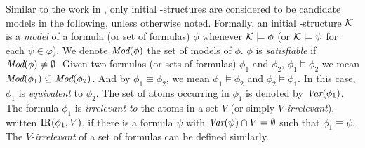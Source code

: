 \documentclass{article}
\begin{document}
Similar to the work in \cite{DBLP:journals/tcs/BrowneCG88,Bolotov:1999:JETAI},
only initial \MPK-structures are considered to be candidate models
in the following, unless otherwise noted. Formally,
an initial \MPK-structure $\cal K$ is a {\em model} of a formula (or set of formulas) $\phi$
whenever ${\cal K}\models\phi$ (or ${\cal K} \models \psi$ for each $\psi\in \varphi$).
We denote $\textit{Mod}(\phi)$ the set of models of $\phi$.
$\phi$  is {\em satisfiable}
if $\textit{Mod}(\phi)\neq\emptyset$.
Given two formulas (or sets of formulas) $\phi_1$ and $\phi_2$,  $\phi_1\models\phi_2$ we mean $\textit{Mod}(\phi_1)\subseteq\textit{Mod}(\phi_2)$. And
by $\phi_1\equiv\phi_2$, we mean $\phi_1\models\phi_2$ and $\phi_2\models\phi_1$.
In this case, $\phi_1$ is {\em equivalent} to $\phi_2$.
The set of atoms occurring in $\phi_1$ is denoted by $\textit{Var}(\phi_1)$.
The formula $\phi_1$ is {\em irrelevant to} the atoms in a set $V$ (or simply $V$-{\em irrelevant}), written $\textrm{IR}(\phi_1,V)$,
if there is a formula $\psi$ with
$\textit{Var}(\psi)\cap V=\emptyset$ such that $\phi_1\equiv\psi$.
The $V$-{\em irrelevant} of a set of formulas can be defined similarly.
\end{document}

